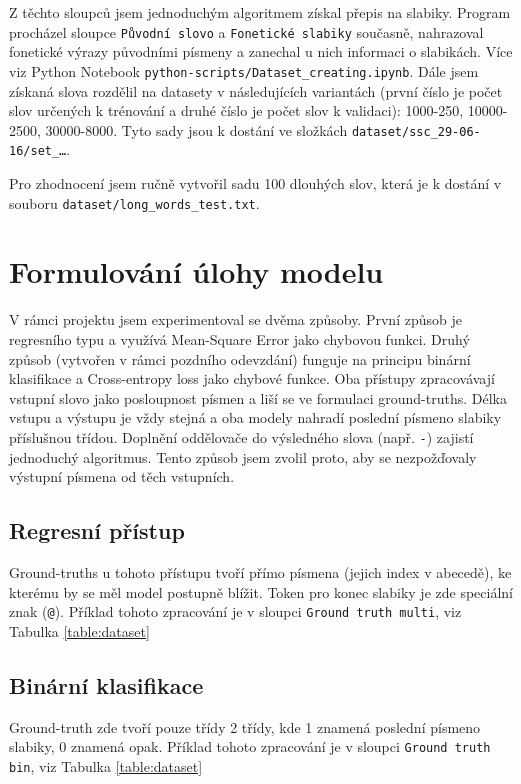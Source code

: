 \documentclass[a4paper]{article}
\theoremstyle{definition}
\begin{document}
Z těchto sloupců jsem jednoduchým algoritmem získal přepis na slabiky. Program procházel sloupce \texttt{Původní slovo} a \texttt{Fonetické slabiky} současně, nahrazoval fonetické výrazy původními písmeny a zanechal u nich informaci o slabikách. Více viz Python Notebook \texttt{python-scripts/Dataset\_creating.ipynb}.
Dále jsem získaná slova rozdělil na datasety v následujících variantách (první číslo je počet slov určených k trénování a druhé číslo je počet slov k validaci): 1000-250, 10000-2500, 30000-8000. Tyto sady jsou k dostání ve složkách \texttt{dataset/ssc\_29-06-16/set\_\dots{}}.

Pro zhodnocení jsem ručně vytvořil sadu 100 dlouhých slov, která je k dostání v souboru \texttt{dataset/long\_words\_test.txt}.

\section{Formulování úlohy modelu}

V rámci projektu jsem experimentoval se dvěma způsoby. První způsob je regresního typu a využívá Mean-Square Error jako chybovou funkci. Druhý způsob (vytvořen v rámci pozdního odevzdání) funguje na principu binární klasifikace a Cross-entropy loss jako chybové funkce.
Oba přístupy zpracovávají vstupní slovo jako posloupnost písmen a liší se ve formulaci ground-truths. Délka vstupu a výstupu je vždy stejná a oba modely nahradí poslední písmeno slabiky příslušnou třídou. Doplnění oddělovače do výsledného slova (např. \texttt{-}) zajistí jednoduchý algoritmus. Tento způsob jsem zvolil proto, aby se nezpožďovaly výstupní písmena od těch vstupních. 

\subsection{Regresní přístup}

Ground-truths u tohoto přístupu tvoří přímo písmena (jejich index v abecedě), ke kterému by se měl model postupně blížit. Token pro konec slabiky je zde speciální znak (\texttt{@}). 
Příklad tohoto zpracování je v sloupci \texttt{Ground truth multi}, viz Tabulka \ref{table:dataset}

\subsection{Binární klasifikace}

Ground-truth zde tvoří pouze třídy 2 třídy, kde 1 znamená poslední písmeno slabiky, 0 znamená opak.
Příklad tohoto zpracování je v sloupci \texttt{Ground truth bin}, viz Tabulka \ref{table:dataset}
\end{document}
